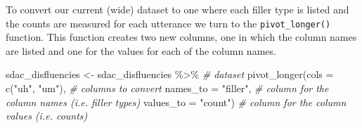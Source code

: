 \documentclass[
]{article}
\newenvironment{Shaded}{\begin{snugshade}}{\end{snugshade}}
\newcommand{\AttributeTok}[1]{\textcolor[rgb]{0.77,0.63,0.00}{#1}}
\newcommand{\CommentTok}[1]{\textcolor[rgb]{0.56,0.35,0.01}{\textit{#1}}}
\newcommand{\FunctionTok}[1]{\textcolor[rgb]{0.00,0.00,0.00}{#1}}
\newcommand{\NormalTok}[1]{#1}
\newcommand{\OtherTok}[1]{\textcolor[rgb]{0.56,0.35,0.01}{#1}}
\newcommand{\SpecialCharTok}[1]{\textcolor[rgb]{0.00,0.00,0.00}{#1}}
\newcommand{\StringTok}[1]{\textcolor[rgb]{0.31,0.60,0.02}{#1}}
\begin{document}
To convert our current (wide) dataset to one where each filler type is listed and the counts are measured for each utterance we turn to the \texttt{pivot\_longer()} function. This function creates two new columns, one in which the column names are listed and one for the values for each of the column names.

\begin{Shaded}
\begin{Highlighting}[]
\NormalTok{sdac\_disfluencies }\OtherTok{\textless{}{-}} 
\NormalTok{  sdac\_disfluencies }\SpecialCharTok{\%\textgreater{}\%} \CommentTok{\# dataset}
  \FunctionTok{pivot\_longer}\NormalTok{(}\AttributeTok{cols =} \FunctionTok{c}\NormalTok{(}\StringTok{"uh"}\NormalTok{, }\StringTok{"um"}\NormalTok{), }\CommentTok{\# columns to convert}
               \AttributeTok{names\_to =} \StringTok{"filler"}\NormalTok{, }\CommentTok{\# column for the column names (i.e. filler types)}
               \AttributeTok{values\_to =} \StringTok{"count"}\NormalTok{) }\CommentTok{\# column for the column values (i.e. counts)}
\end{Highlighting}
\end{Shaded}
\end{document}

